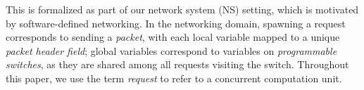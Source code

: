 %
%
This is formalized as part of our network system (NS) setting, which is motivated by software-defined networking. In the networking domain, spawning a request corresponds to sending a \textit{packet}, with each local variable mapped to a unique \textit{packet header field}; global variables correspond to variables on \textit{programmable switches}, as they are shared among all requests visiting the switch. Throughout this paper, we use the term \emph{request} to refer to a concurrent computation unit. 
    
